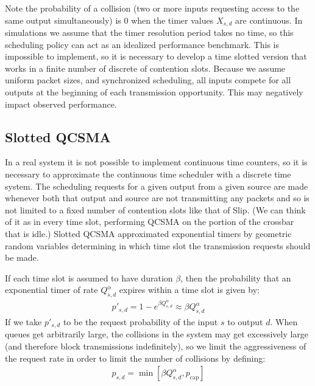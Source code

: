 \documentclass{IEEEtran}%
\begin{document}
Note the probability of a collision (two or more inputs requesting access to the same output simultaneously) is 0 when the timer values $X_{s,d}$ are continuous.  In simulations we assume that the timer resolution period takes no time, so this scheduling policy can act as an idealized performance benchmark.  This is impossible to implement, so it is necessary to develop a time slotted version that works in a finite number of discrete of contention slots.  Because we assume uniform packet sizes, and synchronized scheduling, all inputs compete for all outputs at the beginning of each transmission opportunity.  This may negatively impact observed performance.%

\subsection{Slotted QCSMA} \label{naive_qcsma}


In a real system it is not possible to implement continuous time counters, so it is necessary to approximate the continuous time scheduler with a discrete time system.  The scheduling requests for a given output from a given source are made whenever both that output and source are not transmitting any packets and so is not limited to a fixed number of contention slots like that of Slip.  (We can think of it as in every time slot, performing QCSMA on the portion of the crossbar that is idle.)  Slotted QCSMA approximated exponential timers by geometric random variables determining in which time slot the transmission requests should be made.

If each time slot is assumed to have duration $\beta$, then the probability that an exponential timer of rate $Q_{s,d}^\alpha$ expires within a time slot is given by:
\begin{align}
p'_{s,d} =1-e^{\beta Q_{s,d}^\alpha} \approx \beta Q_{s,d}^\alpha
\end{align}
If we take $p'_{s,d}$ to be the request probability of the input $s$ to output $d$.  When queues get arbitrarily large, the collisions in the system may get excessively large (and therefore block transmissions indefinitely), so we limit the aggressiveness of the request rate in order to limit the number of collisions by defining:
\begin{align}  \label{geo_p}
p_{s,d} =\min \left[ \beta Q_{s,d}^\alpha,p_{\text{cap}}\right]
\end{align}
\end{document}
